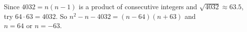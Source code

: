 Since $4032=n(n-1)$ is a product of consecutive integers and $\sqrt{4032}\approx63.5$, try $64\cdot63=4032$. So $n^2-n-4032=(n-64)(n+63)$ and $\boxed{n=64\text{ or }n=-63}$.
